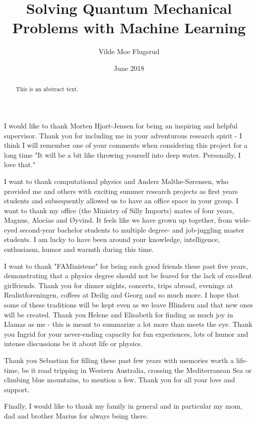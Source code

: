 \documentclass[twoside,english]{uiofysmaster}
\author{Vilde Moe Flugsrud}
\title{Solving Quantum Mechanical Problems with Machine Learning}
\date{June 2018}
\begin{document}
\maketitle

\begin{abstract}
This is an abstract text.
\end{abstract}

\begin{acknowledgements}
I would like to thank Morten Hjort-Jensen for being an inspiring and helpful supervisor. Thank you for including me in your adventurous research spirit - I think I will remember one of your comments when considering this project for a long time "It will be a bit like throwing yourself into deep water. Personally, I love that."

I want to thank computational physics and Anders Malthe-Sørensen, who provided me and others with exciting summer research projects as first years students and subsequently allowed us to have an office space in your group. I want to thank my office (the Ministry of Silly Imports) mates of four years, Magnus, Alocias and Øyvind. It feels like we have grown up together, from wide-eyed second-year bachelor students to multiple degree- and job-juggling master students. I am lucky to have been around your knowledge, intelligence, enthusiasm, humor and warmth during this time.

I want to thank "FAMinistene" for being such good friends these past five years, demonstrating that a physics degree should not be feared for the lack of excellent girlfriends. Thank you for dinner nights, concerts, trips abroad, evenings at Realistforeningen, coffees at Deilig and Georg and so much more. I hope that some of these traditions will be kept even as we leave Blindern and that new ones will be created. Thank you Helene and Elisabeth for finding as much joy in Llamas as me - this is meant to summarize a lot more than meets the eye. Thank you Ingrid for your never-ending capacity for fun experiences, lots of humor and intense discussions be it about life or physics.

Thank you Sebastian for filling these past few years with memories worth a life-time, be it road tripping in Western Australia, crossing the Mediterranean Sea or climbing blue mountains, to mention a few. Thank you for all your love and support.

Finally, I would like to thank my family in general and in particular my mom, dad and brother Marius for always being there. 
\end{acknowledgements}
\end{document}
